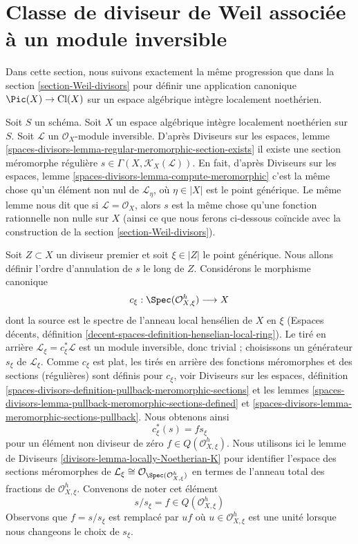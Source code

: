 \section{Classe de diviseur de Weil associée à un module inversible}
\label{section-c1}

\noindent
Dans cette section, nous suivons exactement la même progression que dans la
section \ref{section-Weil-divisors} pour définir une application canonique
$\Pic(X) \to \text{Cl}(X)$
sur un espace algébrique intègre localement noethérien.

\medskip\noindent
Soit $S$ un schéma. Soit $X$ un espace algébrique intègre localement noethérien
sur $S$. Soit $\mathcal{L}$ un $\mathcal{O}_X$-module inversible.
D'après Diviseurs sur les espaces, lemme
\ref{spaces-divisors-lemma-regular-meromorphic-section-exists}
il existe une section méromorphe régulière
$s \in \Gamma(X, \mathcal{K}_X(\mathcal{L}))$.
En fait, d'après Diviseurs sur les espaces, lemme
\ref{spaces-divisors-lemma-compute-meromorphic}
c'est la même chose qu'un élément non nul de
$\mathcal{L}_\eta$, où $\eta \in |X|$ est le point générique.
Le même lemme nous dit que si $\mathcal{L} = \mathcal{O}_X$,
alors $s$ est la même chose qu'une fonction rationnelle non nulle sur $X$
(ainsi ce que nous ferons ci-dessous coïncide avec la construction de la
section \ref{section-Weil-divisors}).

\medskip\noindent
Soit $Z \subset X$ un diviseur premier et soit $\xi \in |Z|$ le point générique.
Nous allons définir l'ordre d'annulation de $s$ le long de $Z$.
Considérons le morphisme canonique
$$
c_\xi : \Spec(\mathcal{O}_{X, \xi}^h) \longrightarrow X
$$
dont la source est le spectre de l'anneau local hensélien de $X$ en $\xi$
(Espaces décents, définition \ref{decent-spaces-definition-henselian-local-ring}).
Le tiré en arrière $\mathcal{L}_\xi = c_\xi^*\mathcal{L}$
est un module inversible, donc trivial ; choisissons un générateur $s_\xi$ de
$\mathcal{L}_\xi$. Comme $c_\xi$ est plat, les tirés en arrière des fonctions méromorphes
et des sections (régulières) sont définis pour $c_\xi$, voir
Diviseurs sur les espaces, définition
\ref{spaces-divisors-definition-pullback-meromorphic-sections} et
les lemmes \ref{spaces-divisors-lemma-pullback-meromorphic-sections-defined} et
\ref{spaces-divisors-lemma-meromorphic-sections-pullback}.
Nous obtenons ainsi
$$
c_\xi^*(s) = f s_\xi
$$
pour un élément non diviseur de zéro $f \in Q(\mathcal{O}_{X, \xi}^h)$.
Nous utilisons ici le lemme de Diviseurs \ref{divisors-lemma-locally-Noetherian-K}
pour identifier l'espace des sections méromorphes de
$\mathcal{L}_\xi \cong \mathcal{O}_{\Spec(\mathcal{O}_{X, \xi}^h)}$
en termes de l'anneau total des fractions de $\mathcal{O}_{X, \xi}^h$.
Convenons de noter cet élément
$$
s/s_\xi = f \in  Q(\mathcal{O}_{X, \xi}^h)
$$
Observons que $f = s/s_\xi$
est remplacé par $uf$ où $u \in \mathcal{O}_{X, \xi}^h$
est une unité lorsque nous changeons le choix de $s_\xi$.

